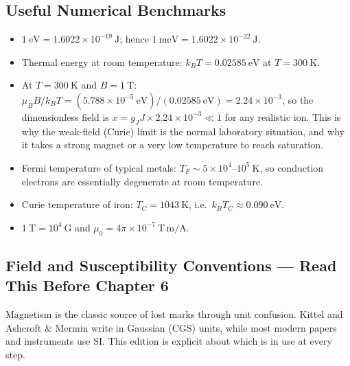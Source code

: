 \documentclass[11pt,a4paper]{article}
\begin{document}
\subsection*{Useful Numerical Benchmarks}
\begin{itemize}[leftmargin=1.5cm]
    \item $1\ \mathrm{eV} = 1.6022\times10^{-19}\ \mathrm{J}$; hence $1\ \mathrm{meV} = 1.6022\times10^{-22}\ \mathrm{J}$.
    \item Thermal energy at room temperature: $k_B T = 0.02585\ \mathrm{eV}$ at $T = 300\ \mathrm{K}$.
    \item At $T = 300\ \mathrm{K}$ and $B = 1\ \mathrm{T}$: $\mu_B B/k_BT = (5.788\times10^{-5}\ \mathrm{eV})/(0.02585\ \mathrm{eV}) = 2.24\times10^{-3}$, so the dimensionless field is $x = g_JJ\times2.24\times10^{-3}\ll1$ for any realistic ion. This is why the weak-field (Curie) limit is the normal laboratory situation, and why it takes a strong magnet or a very low temperature to reach saturation.
    \item Fermi temperature of typical metals: $T_F \sim 5\times10^{4}$--$10^{5}\ \mathrm{K}$, so conduction electrons are essentially degenerate at room temperature.
    \item Curie temperature of iron: $T_C = 1043\ \mathrm{K}$, i.e.\ $k_B T_C \approx 0.090\ \mathrm{eV}$.
    \item $1\ \mathrm{T} = 10^{4}\ \mathrm{G}$ and $\mu_0 = 4\pi\times10^{-7}\ \mathrm{T\,m/A}$.
\end{itemize}

\subsection*{Field and Susceptibility Conventions --- Read This Before Chapter 6}

Magnetism is the classic source of lost marks through unit confusion. Kittel and Ashcroft \& Mermin write in Gaussian (CGS) units, while most modern papers and instruments use SI. This edition is explicit about which is in use at every step.
\end{document}
